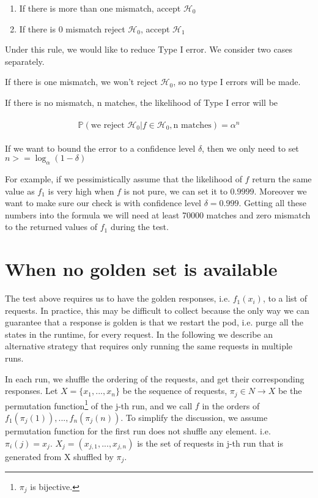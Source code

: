 \documentclass[]{article}
\begin{document}
\begin{enumerate}
\item If there is more than one mismatch, accept $\mathcal{H}_0$
\item If there is 0 mismatch reject $\mathcal{H}_0$, accept 
$\mathcal{H}_1$
\end{enumerate}

Under this rule, we would like to reduce Type I error. We consider two cases 
separately. 

If there is one mismatch, we won't reject $\mathcal{H}_0$, so no type I 
errors will be made.

If there is no mismatch, n matches, the likelihood of Type I error will be

\begin{align}
    \begin{split}
     \mathbb{P}(\text{we reject } \mathcal{H}_0 | f\in\mathcal{H}_0, \text{n 
     matches})=\alpha^n
    \end{split}
\end{align}

If we want to bound the error to a confidence level $\delta$, then we only 
need to set $n >= \log_{\alpha}{(1 - \delta)}$

For example, if we pessimistically assume that the likelihood of $f$ return the 
same value as $f_1$ is very high when $f$ is not pure, we can set it to 
$0.9999$. Moreover we want to make 
sure our check is with confidence level $\delta=0.999$. Getting all these 
numbers into the formula we will need at least 70000 matches and zero mismatch  
to the returned values of $f_1$ during the test.

\section{When no golden set is available}

The test above requires us to have the golden responses, i.e. $f_1(x_i)$, to a 
list of requests. 
In practice, this may be difficult to collect because the only way we can 
guarantee that a response is golden is that we restart the pod, i.e. 
purge all the states in the runtime, 
for every request. In the following we 
describe an alternative strategy that requires only running the same 
requests in multiple runs.

In each run, we shuffle the ordering of the requests, and get their 
corresponding responses. Let $X = \{x_1, ..., x_n\}$ be the sequence of 
requests, 
$\pi_j\in N \rightarrow X $ be the permutation function\footnote{$\pi_j$  is 
    bijective.} of the j-th run, and we 
call $f$ in the 
orders of $f_1(\pi_j(1)), ..., f_n(\pi_j(n))$. To simplify the discussion, we 
assume permutation function for the first run does not shuffle any element. 
i.e. $\pi_i(j) = x_j$. $X_j = (x_{j, 1}, ..., x_{j, n})$ is the set of requests 
in j-th run that is generated from X shuffled by $\pi_j$.
\end{document}
